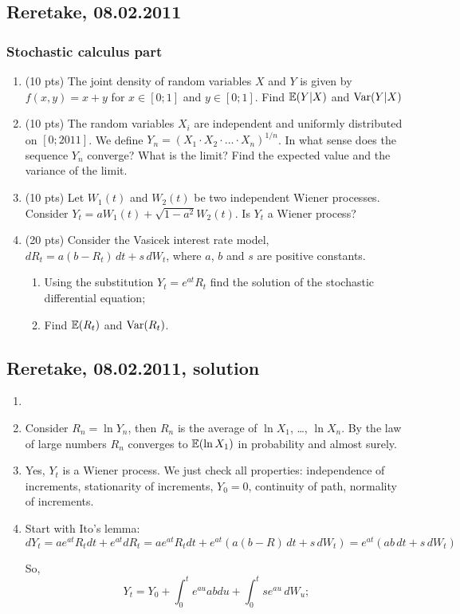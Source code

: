 \documentclass[12pt, a4paper]{article}
\begin{document}
\subsection{Reretake, 08.02.2011}

\subsubsection*{Stochastic calculus part}

\begin{enumerate}

\item (10 pts) The joint density of random variables $X$ and $Y$ is given by $f(x,y)=x+y$ for $x\in [0;1]$ and $y\in[0;1]$. Find $\mathbb{E}(Y|X)$ and $\operatorname{Var}(Y|X)$
\item (10 pts) The random variables $X_i$ are independent and uniformly distributed on $[0;2011]$. We define $Y_n=(X_1\cdot X_2\cdot \ldots \cdot X_n)^{1/n}$. In what sense does the sequence $Y_n$ converge? What is the limit? Find the expected value and the variance of the limit.
\item (10 pts) Let $W_1(t)$ and $W_2(t)$ be two independent Wiener processes. Consider $Y_t=aW_1(t)+\sqrt{1-a^2}W_2 (t)$. Is $Y_t$ a Wiener process?
\item (20 pts) Consider the Vasicek interest rate model, $dR_t=a(b-R_t) \, dt+s \, dW_t$, where $a$, $b$ and $s$ are positive constants.
\begin{enumerate}
\item Using the substitution $Y_t=e^{at} R_t$ find the solution of the stochastic differential equation;
\item Find $\mathbb{E}(R_t)$ and $\operatorname{Var}(R_t)$.
\end{enumerate}


\end{enumerate}

\subsection{Reretake, 08.02.2011, solution}

\begin{enumerate}
\item
\item Consider $R_n = \ln Y_n$, then $R_n$ is the average of $\ln X_1$, \ldots, $\ln X_n$. By the law of large numbers $R_n$ converges to $\mathbb{E}(\ln X_1)$ in probability and almost surely.
\item Yes, $Y_t$ is a Wiener process. We just check all properties: independence of increments, stationarity of increments, $Y_0=0$, continuity of path, normality of increments.
\item Start with Ito's lemma:
\[
dY_t = a e^{at} R_t dt + e^{at} dR_t =
a e^{at} R_t dt + e^{at} (a(b-R) \, dt+s \, dW_t) =
 e^{at} (ab \, dt+s \, dW_t)
\]

So,
\[
Y_t = Y_0 + \int_0^t e^{au}ab du + \int_0^t se^{au}\,dW_u;
\]

\end{enumerate}
\end{document}
